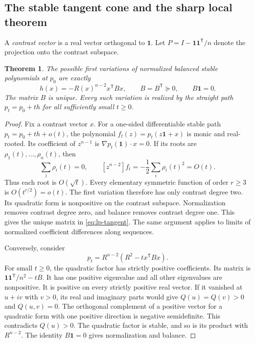 \documentclass[11pt,a4paper]{article}
\newtheorem{theorem}{Theorem}[section]
\theoremstyle{definition}
\theoremstyle{remark}
\newcommand{\T}{\mathsf{T}}
\begin{document}
\subsection{The stable tangent cone and the sharp local theorem}

A \emph{contrast vector} is a real vector orthogonal to $\mathbf1$.
Let $P=I-\mathbf1\mathbf1^\T/n$ denote the projection onto the contrast subspace.

\begin{theorem}\label{thm:lp-stable-tangent}
The possible first variations of normalized balanced stable polynomials at $p_0$ are exactly
\begin{equation}\label{eq:lp-tangent}
 h(x)=-R(x)^{n-2}x^\T Bx,\qquad B=B^\T\succeq0,\qquad B\mathbf1=0.
\end{equation}
The matrix $B$ is unique.
Every such variation is realized by the straight path $p_t=p_0+th$ for all sufficiently small $t\ge0$.
\end{theorem}
\begin{proof}
Fix a contrast vector $x$.
For a one-sided differentiable stable path $p_t=p_0+th+o(t)$, the polynomial
$f_t(z)=p_t(z\mathbf1+x)$ is monic and real-rooted.
Its coefficient of $z^{n-1}$ is $\nabla p_t(\mathbf1)\cdot x=0$.
If its roots are $\rho_1(t),\ldots,\rho_n(t)$, then
\[
 \sum_i\rho_i(t)=0,\qquad
 [z^{n-2}]f_t=-\frac12\sum_i\rho_i(t)^2=O(t).
\]
Thus each root is $O(\sqrt t)$.
Every elementary symmetric function of order $r\ge3$ is $O(t^{r/2})=o(t)$.
The first variation therefore has only contrast degree two.
Its quadratic form is nonpositive on the contrast subspace.
Normalization removes contrast degree zero, and balance removes contrast degree one.
This gives the unique matrix in \eqref{eq:lp-tangent}.
The same argument applies to limits of normalized coefficient differences along sequences.

Conversely, consider
\[
 p_t=R^{n-2}(R^2-tx^\T Bx).
\]
For small $t\ge0$, the quadratic factor has strictly positive coefficients.
Its matrix is $\mathbf1\mathbf1^\T/n^2-tB$.
It has one positive eigenvalue and all other eigenvalues are nonpositive.
It is positive on every strictly positive real vector.
If it vanished at $u+iv$ with $v>0$, its real and imaginary parts would give
$Q(u)=Q(v)>0$ and $Q(u,v)=0$.
The orthogonal complement of a positive vector for a quadratic form with one positive direction is negative semidefinite.
This contradicts $Q(u)>0$.
The quadratic factor is stable, and so is its product with $R^{n-2}$.
The identity $B\mathbf1=0$ gives normalization and balance.
\end{proof}
\end{document}
